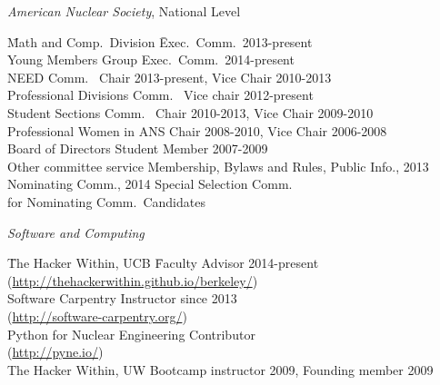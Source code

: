 \textit{American Nuclear Society}, National Level
\begin{tabbing}
\hspace*{2 em}\= Math and Comp.\ Division \hspace*{6em} \= Exec.\ Comm.\ 2013-present \\
%
\> Young Members Group \> Exec.\ Comm.\ 2014-present\\
%
\> NEED Comm.\ \> Chair 2013-present, Vice Chair 2010-2013\\
%
\> Professional Divisions Comm.\ \>	Vice chair 2012-present \\
%
\> Student Sections Comm.\ \> Chair 2010-2013, Vice Chair 2009-2010\\
%
\> Professional Women in ANS	\> Chair 2008-2010, Vice Chair 2006-2008\\	
%
\> Board of Directors \>	Student Member 2007-2009\\
%
\> Other committee service \>	Membership, Bylaws and Rules, Public Info., 2013 \\ \> \> Nominating Comm., 2014 Special Selection Comm.\ \\ \> \> for Nominating Comm.\ Candidates
\end{tabbing}

\vspace*{-.5em}
\textit{Software and Computing}
\begin{tabbing}
\hspace*{2 em}\= The Hacker Within, UCB \hspace*{6em} \= Faculty Advisor 2014-present\\
\>\hspace*{2 em}(\href{http://thehackerwithin.github.io/berkeley/}{http://thehackerwithin.github.io/berkeley/})\\
%
\> Software Carpentry  \> Instructor since 2013\\
\> \hspace*{2 em}(\href{http://software-carpentry.org/}{http://software-carpentry.org/})\\
%
\> Python for Nuclear Engineering  \> Contributor \\
\> \hspace*{2 em}(\href{http://pyne.io/}{http://pyne.io/})\\
%
\> The Hacker Within, UW \> Bootcamp instructor 2009, Founding member 2009
\end{tabbing}

